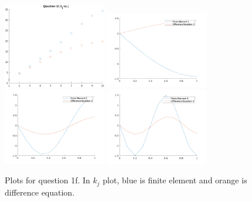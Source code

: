 \documentclass[letterpaper, reqno,11pt]{article}
\begin{document}
\begin{figure}[htpb]
  \centering
  \includegraphics[width=0.4\textwidth]{./q1fkj.png}
  \includegraphics[width=0.4\textwidth]{./q1feig=1.png}
  \includegraphics[width=0.4\textwidth]{./q1feig=2.png}
  \includegraphics[width=0.4\textwidth]{./q1feig=3.png}
  \caption{Plots for question 1f. In $k_j$ plot, blue is finite element and orange is difference equation.}
  \label{fig:q1f}
\end{figure}
\end{document}
